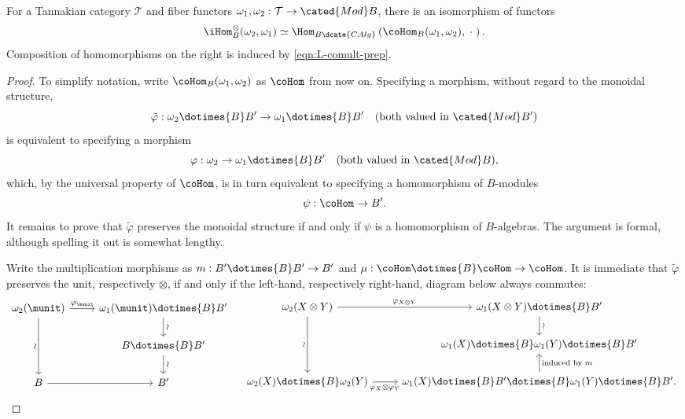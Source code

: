 \begin{proposition}\label{prop:Isom-Tannakian}
	For a Tannakian category $\mathcal{T}$ and fiber functors
	$\omega_1,\omega_2:\mathcal{T}\to\cated{Mod}B$, there is an isomorphism
	of functors
	\[ \iHom^\otimes_B(\omega_2, \omega_1) \simeq \Hom_{B\dcate{CAlg}}\left( \coHom_B(\omega_1, \omega_2) , \; \cdot \; \right). \]
	Composition of homomorphisms on the right is induced by
	\eqref{eqn:L-comult-prep}.
\end{proposition}
\begin{proof}
	To simplify notation, write $\coHom_B(\omega_1,\omega_2)$ as $\coHom$
	from now on. Specifying a morphism, without regard to the monoidal
	structure,
	\[ \tilde{\varphi}: \omega_2 \dotimes{B} B' \to \omega_1 \dotimes{B} B' \quad (\text{both valued in }\cated{Mod}B') \]
	is equivalent to specifying a morphism
	\[ \varphi: \omega_2 \to \omega_1 \dotimes{B} B' \quad (\text{both valued in }\cated{Mod}B), \]
	which, by the universal property of $\coHom$, is in turn equivalent to
	specifying a homomorphism of $B$-modules
	\[ \psi: \coHom \to B'. \]
	It remains to prove that $\tilde{\varphi}$ preserves the monoidal
	structure if and only if $\psi$ is a homomorphism of $B$-algebras. The
	argument is formal, although spelling it out is somewhat lengthy.

	Write the multiplication morphisms as
	$m:B'\dotimes{B}B'\to B'$ and
	$\mu:\coHom\dotimes{B}\coHom\to\coHom$. It is immediate that
	$\tilde{\varphi}$ preserves the unit, respectively $\otimes$, if and only
	if the left-hand, respectively right-hand, diagram below always commutes:
	\[\begin{tikzcd}
		\omega_2(\munit) \arrow[dd, "\sim"' sloped] \arrow[r, "{\varphi_{\munit}}"] & \omega_1(\munit) \dotimes{B} B' \arrow[d, "\sim" sloped] \\
		& B \dotimes{B} B' \arrow[d, "\sim" sloped] \\
		B \arrow[r] & B'
	\end{tikzcd} \quad
	\begin{tikzcd}
		\omega_2(X \otimes Y) \arrow[r, "{\varphi_{X \otimes Y}}"] \arrow[dd, "\sim"' sloped] & \omega_1(X \otimes Y) \dotimes{B} B' \arrow[d, "\sim" sloped] \\
		& \omega_1(X) \dotimes{B} \omega_1(Y) \dotimes{B} B' \\
		\omega_2(X) \dotimes{B} \omega_2(Y) \arrow[r, "{\varphi_X \otimes \varphi_Y}"'] & \omega_1(X) \dotimes{B} B' \dotimes{B} \omega_1(Y) \dotimes{B} B' . \arrow[u, "{\text{induced by }m}"']
	\end{tikzcd}\]


\end{proof}
